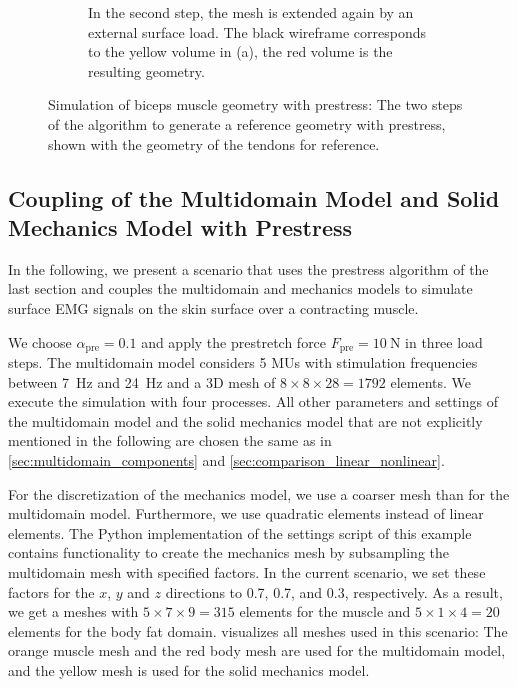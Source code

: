 \begin{figure}
\begin{subfigure}[t]{0.48\textwidth}
    \caption{In the second step, the mesh is extended again by an external surface load. The black wireframe corresponds to the yellow volume in (a), the red volume is the resulting geometry.}%
    \label{fig:neuromuscular_prestretch_2}%
  \end{subfigure}
  \hfill
  \caption{Simulation of biceps muscle geometry with prestress: The two steps of the algorithm to generate a reference geometry with prestress, shown with the geometry of the tendons for reference.}%
  \label{fig:neuromuscular_prestretch}%
\end{figure}%


\subsection{Coupling of the Multidomain Model and Solid Mechanics Model with Prestress}\label{sec:multidomain_contraction}

In the following, we present a scenario that uses the prestress algorithm of the last section and couples the multidomain and mechanics models to simulate surface EMG signals on the skin surface over a contracting muscle.

We choose $\alpha_\text{pre}=0.1$ and apply the prestretch force $F_\text{pre}=\SI{10}{\newton}$ in three load steps. The multidomain model considers 5 MUs with stimulation frequencies between \SI{7}{\hertz} and \SI{24}{\hertz} and a 3D mesh of $8 \times 8 \times 28 = 1792$ elements. We execute the simulation with four processes. All other parameters and settings of the multidomain model and the solid mechanics model that are not explicitly mentioned in the following are chosen the same as in \cref{sec:multidomain_components} and \cref{sec:comparison_linear_nonlinear}.

For the discretization of the mechanics model, we use a coarser mesh than for the multidomain model. Furthermore, we use quadratic elements instead of linear elements. The Python implementation of the settings script of this example contains functionality to create the mechanics mesh by subsampling the multidomain mesh with specified factors. In the current scenario, we set these factors for the $x$, $y$ and $z$ directions to 0.7, 0.7, and 0.3, respectively. As a result, we get a meshes with $5 \times 7 \times 9 = 315$ elements for the muscle and $5 \times 1 \times 4 = 20$  elements for the body fat domain.  visualizes all meshes used in this scenario: The orange muscle mesh and the red body mesh are used for the multidomain model, and the yellow mesh is used for the solid mechanics model.


